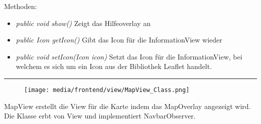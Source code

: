 Methoden:
\begin{itemize} 
    \item \emph{public void show()} Zeigt das Hilfeoverlay an
    \item \emph{public Icon getIcon()} Gibt das Icon für die InformationView wieder
    \item \emph{public void setIcon(Icon icon)} Setzt das Icon für die InformationView, bei welchem es sich um ein Icon aus der Bibliothek \gls{Leaflet} handelt.
\end{itemize}

\rule{\textwidth}{0.4pt} 
\begin{minipage}{0.3\textwidth}
    \begin{figure}[H]
        \texttt{[image: media/frontend/view/MapView\_Class.png]}
    \end{figure}
    \end{minipage} \hfill
    \begin{minipage}{0.6\textwidth}
MapView erstellt die View für die Karte indem das MapOverlay angezeigt wird. Die Klasse erbt von View und implementiert NavbarObserver.
\end{minipage}

